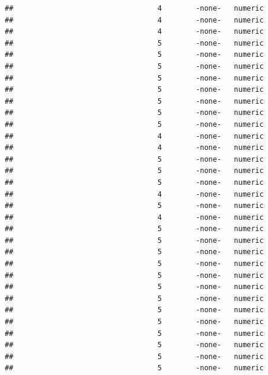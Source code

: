\documentclass[
  12pt,
]{article}
\begin{document}
\begin{verbatim}
##                                  4        -none-   numeric                    
##                                  4        -none-   numeric                    
##                                  4        -none-   numeric                    
##                                  5        -none-   numeric                    
##                                  5        -none-   numeric                    
##                                  5        -none-   numeric                    
##                                  5        -none-   numeric                    
##                                  5        -none-   numeric                    
##                                  5        -none-   numeric                    
##                                  5        -none-   numeric                    
##                                  5        -none-   numeric                    
##                                  4        -none-   numeric                    
##                                  4        -none-   numeric                    
##                                  5        -none-   numeric                    
##                                  5        -none-   numeric                    
##                                  5        -none-   numeric                    
##                                  4        -none-   numeric                    
##                                  5        -none-   numeric                    
##                                  4        -none-   numeric                    
##                                  5        -none-   numeric                    
##                                  5        -none-   numeric                    
##                                  5        -none-   numeric                    
##                                  5        -none-   numeric                    
##                                  5        -none-   numeric                    
##                                  5        -none-   numeric                    
##                                  5        -none-   numeric                    
##                                  5        -none-   numeric                    
##                                  5        -none-   numeric                    
##                                  5        -none-   numeric                    
##                                  5        -none-   numeric                    
##                                  5        -none-   numeric                    
##                                  5        -none-   numeric                    

\end{verbatim}
\end{document}
